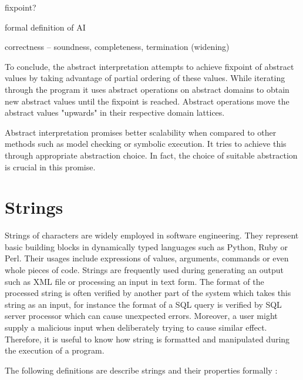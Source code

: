 \documentclass[12pt,final,oneside]{fithesis2}
\theoremstyle{definition}
\begin{document}
fixpoint?

formal definition of AI

correctness -- soundness, completeness, termination (widening)

To conclude, the abstract interpretation attempts to achieve fixpoint of abstract
values by taking advantage of partial ordering of these values. While iterating
through the program it uses abstract operations on abstract domains to obtain new
abstract values until the fixpoint is reached. Abstract operations move the abstract
values "upwards" in their respective domain lattices.

Abstract interpretation promises better scalability when compared to other
methods such as model checking or symbolic execution. It tries to achieve
this through appropriate abstraction choice. In fact, the choice of suitable abstraction
is crucial in this promise.


\section{Strings}
\label{sec:strings}

Strings of characters are widely employed in software engineering. They
represent basic building blocks in dynamically typed languages such as
Python, Ruby or Perl. Their usages include expressions of values,
arguments, commands or even whole pieces of code. Strings are frequently
used during generating an output such as XML file or processing an input
in text form. The format of the processed string is often verified by
another part of the system which takes this string as an input, for
instance the format of a SQL query is verified by SQL server processor
which can cause unexpected errors. Moreover, a user might supply a
malicious input when deliberately trying to cause similar effect.
Therefore, it is useful to know how string is formatted and manipulated
during the execution of a program.

The following definitions are describe strings and their properties
formally \cite{Kozen97-1}:
\end{document}
